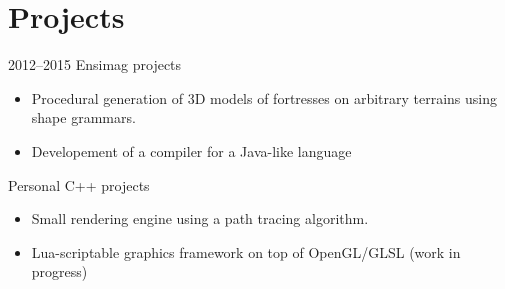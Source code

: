 \documentclass[]{friggeri-cv}
\begin{document}
\section{Projects}

\begin{entrylist}
  \entry
    {2012--2015}
    {Ensimag projects}
    {}
    {\vspace{-4mm}\begin{itemize}
    \item Procedural generation of 3D models of fortresses on arbitrary terrains using shape grammars.
    \item Developement of a compiler for a Java-like language
    \end{itemize}}

  \entry
    {}
    {Personal C++ projects}
    {}
    {\vspace{-4mm}\begin{itemize}
\item Small rendering engine using a path tracing algorithm.
\item Lua-scriptable graphics framework on top of OpenGL/GLSL (work in progress) 
\end{itemize}}

\end{entrylist}



% 
\end{document}
